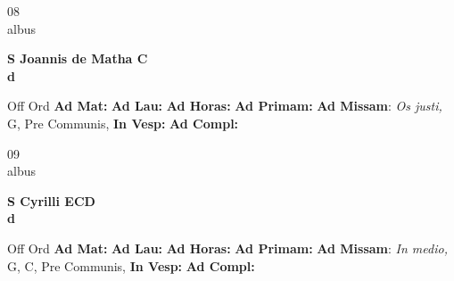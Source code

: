 \documentclass[10pt, openany]{book}
\begin{document}
    \begin{center}
        \begin{minipage}{3.5in}
            \vspace{2em}
            \begin{minipage}{0.5in}
                {\Huge 08} \\
                {\normalsize albus}
            \end{minipage}
            \begin{minipage}{3.0in}
                \textbf{ \large S Joannis de Matha C \\
                \textnormal{\normalsize d}}

            \end{minipage}
            \begin{justify}Off Ord
                \textbf{Ad Mat: }
                \textbf{Ad Lau: }
                \textbf{Ad Horas: }
                \textbf{Ad Primam: }\textbf{Ad Missam}: \textit{Os justi,} G, Pre Communis, 
                \textbf{In Vesp: }
                \textbf{Ad Compl: }
            \end{justify}
        \end{minipage}
    \end{center}

    \begin{center}
        \begin{minipage}{3.5in}
            \vspace{2em}
            \begin{minipage}{0.5in}
                {\Huge 09} \\
                {\normalsize albus}
            \end{minipage}
            \begin{minipage}{3.0in}
                \textbf{ \large S Cyrilli ECD \\
                \textnormal{\normalsize d}}

            \end{minipage}
            \begin{justify}Off Ord
                \textbf{Ad Mat: }
                \textbf{Ad Lau: }
                \textbf{Ad Horas: }
                \textbf{Ad Primam: }\textbf{Ad Missam}: \textit{In medio,} G, C, Pre Communis, 
                \textbf{In Vesp: }
                \textbf{Ad Compl: }
            \end{justify}
        \end{minipage}
    \end{center}
\end{document}
